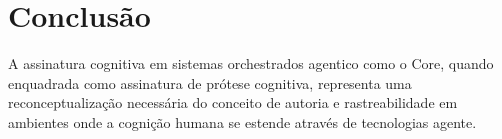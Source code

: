 \documentclass[12pt,a4paper]{article}
\begin{document}





\section{Conclusão}

A assinatura cognitiva em sistemas orchestrados agentico como o Core, quando enquadrada como assinatura de prótese cognitiva, representa uma reconceptualização necessária do conceito de autoria e rastreabilidade em ambientes onde a cognição humana se estende através de tecnologias agente.

\end{document}

